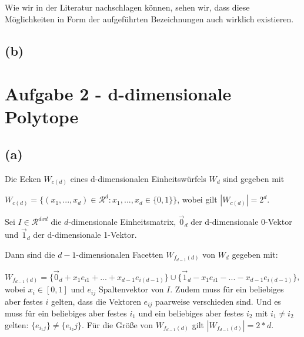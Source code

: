 \documentclass[a4paper]{article}
\begin{document}
 Wie wir in der Literatur nachschlagen können, sehen wir, dass diese Möglichkeiten 
 in Form der aufgeführten Bezeichnungen auch wirklich existieren.
  

\subsection*{(b)}
\begin{figure}[!htb]
\end{figure} 

\section*{Aufgabe 2 - d-dimensionale Polytope}

\subsection*{(a)}
Die Ecken $W_{c(d)}$ eines d-dimensionalen Einheitswürfels $W_d$ sind gegeben mit

$W_{c(d)}=\{(x_1, ..., x_d) \in \mathcal{R}^d : x_1, ..., x_d \in \{0, 1\}\}$, 
wobei gilt $|W_{c(d)}| = 2^d$.

Sei $I \in \mathcal{R}^{d x d}$ die $d$-dimensionale Einheitsmatrix, 
$\vec{0}_d$ der d-dimensionale 0-Vektor und $\vec{1}_d$ der d-dimensionale
1-Vektor.

Dann sind die $d-1$-dimensionalen Facetten $W_{f_{d-1}(d)}$ von $W_d$ gegeben mit:

$W_{f_{d-1}(d)} = \{\vec{0}_d + x_1 e_{i1} + ... + x_{d-1} e_{i(d-1)}\} \cup \{\vec{1}_d - x_1 e_{i1} - ... - x_{d-1} e_{i(d-1)}\}$, wobei $x_i \in [0,1]$ und $e_{ij}$ Spaltenvektor von $I$.
Zudem muss für ein beliebiges aber festes $i$ gelten, dass die Vektoren $e_{ij}$ paarweise
verschieden sind. Und es muss für ein beliebiges aber festes $i_1$ 
und ein beliebiges aber festes $i_2$ mit $i_1 \neq i_2$ gelten: 
$\{e_{i_1j}\} \neq \{e_{i_2}j\}$.
Für die Größe von $W_{f_{d-1}(d)}$ gilt $|W_{f_{d-1}(d)}| = 2*d$.
\end{document}

